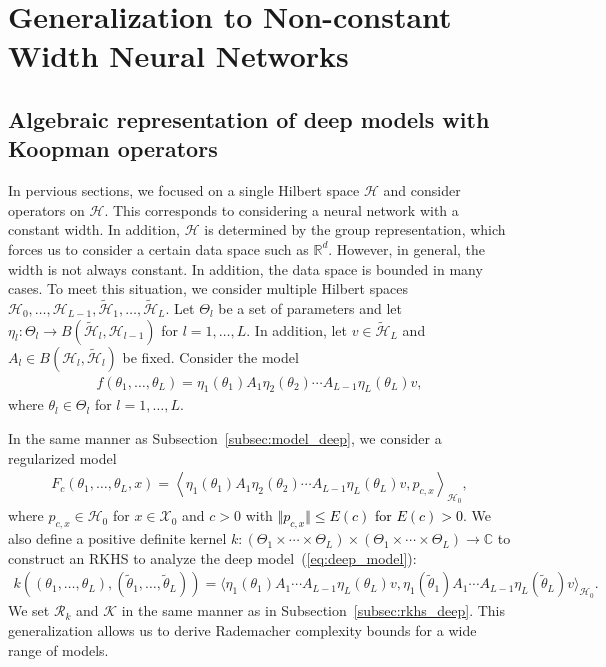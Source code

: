 \documentclass[twoside]{article}
\def\mcl#1{\mathcal{#1}}
\def\bracket#1{\left\langle #1\right\rangle}
\def\hil{\mcl{H}}
\def\red#1{\textcolor{black}{#1}}
\def\eqref#1{(\ref{#1})}
\begin{document}
\section{Generalization to Non-constant Width Neural Networks}\label{sec:non_constant}
\subsection{Algebraic representation of deep models with Koopman operators}\label{subsec:deep_model_general}
In pervious sections, we focused on a single Hilbert space $\hil$ and consider operators on $\hil$.
This corresponds to considering a neural network with a constant width.
In addition, $\hil$ is determined by the group representation, which forces us to consider a certain data space such as $\mathbb{R}^d$.
However, in general, the width is not always constant.
In addition, the data space is bounded in many cases.
To meet this situation, we consider multiple Hilbert spaces $\hil_0,\ldots,\hil_{L-1},\tilde{\hil}_1,\ldots,\tilde{\hil}_L$.
Let $\Theta_l$ be a set of parameters and let $\eta_l:\Theta_l\to B(\tilde{\hil}_l,\hil_{l-1})$ for $l=1,\ldots,L$.
In addition, let $v\in \tilde{\hil}_L$ and $A_l\in B(\hil_l,\tilde{\hil}_l)$ be fixed.
Consider the model
\begin{align*}
f(\theta_1,\ldots,\theta_L)=\eta_1(\theta_1)A_1\eta_2(\theta_2)\cdots A_{L-1}\eta_L(\theta_L)v,
\end{align*}
where $\theta_l\in\Theta_l$ for $l=1,\ldots,L$.

In the same manner as Subsection~\ref{subsec:model_deep}, we consider a regularized model
\begin{align*}
F_c(\theta_1,\ldots,\theta_L,x)=\bracket{\eta_1(\theta_1)A_1\eta_2(\theta_2)\cdots A_{L-1}\eta_L(\theta_L)v,p_{c,x}}_{\hil_0},
\end{align*}
where $p_{c,x}\in\hil_0$ for $x\in\mcl{X}_0$ and $c>0$ with \red{$\Vert p_{c,x}\Vert\le E(c)$ for $E(c)>0$}.
We also define a positive definite kernel $k: (\Theta_1 \times \cdots \times \Theta_L) \times (\Theta_1 \times \cdots \times \Theta_L) \to \mathbb{C}$ to construct an RKHS to analyze the deep model~\eqref{eq:deep_model}:
\begin{align*}
k((\theta_1, \ldots, \theta_L), (\tilde{\theta}_1, \ldots, \tilde{\theta}_L)) = \langle \eta_1(\theta_1) A_1 \cdots A_{L-1} \eta_L(\theta_L) v, \eta_1(\tilde{\theta}_1) A_1 \cdots A_{L-1} \eta_L(\tilde{\theta}_L) v \rangle_{\hil_0}.
\end{align*}
We set $\mcl{R}_k$ and $\mcl{K}$ in the same manner as in Subsection~\ref{subsec:rkhs_deep}.
This generalization allows us to derive Rademacher complexity bounds for a wide range of models.
\end{document}
